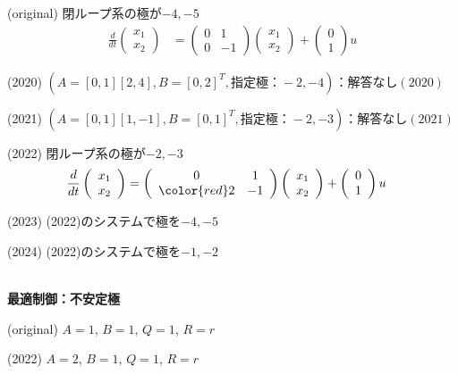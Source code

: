 (original)
閉ループ系の極が$-4,-5$
\begin{align*}
	\frac{d}{dt}
	\left (
	\begin{array}{c}
	 x_1 \\ x_2 
	\end{array}
	\right )
	& = 
	\left (
	\begin{array}{cc}
	 0 & 1 \\
	 0 & -1
	\end{array}
	\right )
	\left (
	\begin{array}{c}
	 x_1 \\ x_2 
	\end{array}
	\right )
	+
	\left (
	\begin{array}{c}
	 0 \\ 1 
	\end{array}
	\right )
	u
\end{align*}

(2020) $(A=[0, 1][2, 4], B=[0, 2]^T, 指定極：-2,-4)：解答なし(2020) $

(2021) $(A=[0, 1][1, -1], B=[0, 1]^T, 指定極：-2,-3)：解答なし(2021)$

(2022)
閉ループ系の極が{\color{red}$-2,-3$}
\begin{align*}
	\frac{d}{dt}
	\left (
	\begin{array}{c}
	 x_1 \\ x_2 
	\end{array}
	\right )
	& = 
	\left (
	\begin{array}{cc}
	 0 & 1 \\
	 \color{red} 2 & -1
	\end{array}
	\right )
	\left (
	\begin{array}{c}
	 x_1 \\ x_2 
	\end{array}
	\right )
	+
	\left (
	\begin{array}{c}
	 0 \\ 1 
	\end{array}
	\right )
	u
\end{align*}

(2023) (2022)のシステムで極を{\color{red}$-4,-5$}

(2024) (2022)のシステムで極を{\color{red}$-1,-2$}

\ \\ \noindent
{\bf 最適制御：不安定極}

(original)
$A=1$, $B=1$, $Q=1$, $R=r$

(2022)
{\color{red}$A=2$}, $B=1$, $Q=1$, $R=r$

